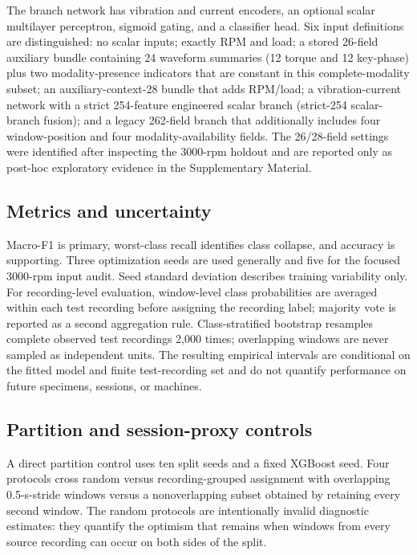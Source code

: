 \documentclass[11pt]{article}
\begin{document}
The branch network has vibration and current encoders, an optional scalar multilayer perceptron, sigmoid gating, and a classifier head. Six input definitions are distinguished: no scalar inputs; exactly RPM and load; a stored 26-field auxiliary bundle containing 24 waveform summaries (12 torque and 12 key-phase) plus two modality-presence indicators that are constant in this complete-modality subset; an auxiliary-context-28 bundle that adds RPM/load; a vibration-current network with a strict 254-feature engineered scalar branch (strict-254 scalar-branch fusion); and a legacy 262-field branch that additionally includes four window-position and four modality-availability fields. The 26/28-field settings were identified after inspecting the 3000-rpm holdout and are reported only as post-hoc exploratory evidence in the Supplementary Material.

\subsection{Metrics and uncertainty}
Macro-F1 is primary, worst-class recall identifies class collapse, and accuracy is supporting. Three optimization seeds are used generally and five for the focused 3000-rpm input audit. Seed standard deviation describes training variability only. For recording-level evaluation, window-level class probabilities are averaged within each test recording before assigning the recording label; majority vote is reported as a second aggregation rule. Class-stratified bootstrap resamples complete observed test recordings 2,000 times; overlapping windows are never sampled as independent units. The resulting empirical intervals are conditional on the fitted model and finite test-recording set and do not quantify performance on future specimens, sessions, or machines.

\subsection{Partition and session-proxy controls}
A direct partition control uses ten split seeds and a fixed XGBoost seed. Four protocols cross random versus recording-grouped assignment with overlapping 0.5-s-stride windows versus a nonoverlapping subset obtained by retaining every second window. The random protocols are intentionally invalid diagnostic estimates: they quantify the optimism that remains when windows from every source recording can occur on both sides of the split.
\end{document}
